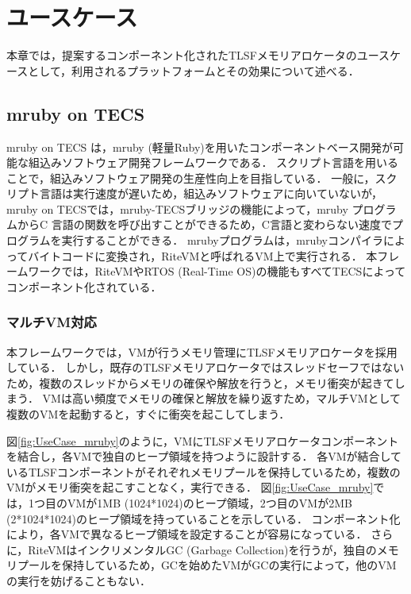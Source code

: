 \documentclass[submit,techrep]{ipsj_v2/UTF8/ipsj}
\begin{document}
\section{ユースケース}
\label{sec:UseCase}

本章では，提案するコンポーネント化されたTLSFメモリアロケータのユースケースとして，利用されるプラットフォームとその効果について述べる．

\subsection{mruby on TECS}
\label{sec:mrubyonTECS}

mruby on TECS は，mruby (軽量Ruby)\cite{par:mruby}\cite{url:mruby}を用いたコンポーネントベース開発が可能な組込みソフトウェア開発フレームワークである\cite{par:mrubyonTECS}．
スクリプト言語を用いることで，組込みソフトウェア開発の生産性向上を目指している．
一般に，スクリプト言語は実行速度が遅いため，組込みソフトウェアに向いていないが，mruby on TECSでは，mruby-TECSブリッジの機能によって，mruby プログラムからC 言語の関数を呼び出すことができるため，C言語と変わらない速度でプログラムを実行することができる．
mrubyプログラムは，mrubyコンパイラによってバイトコードに変換され，RiteVMと呼ばれるVM上で実行される．
本フレームワークでは，RiteVMやRTOS (Real-Time OS)の機能もすべてTECSによってコンポーネント化されている．


\subsubsection{マルチVM対応}

本フレームワークでは，VMが行うメモリ管理にTLSFメモリアロケータを採用している．
しかし，既存のTLSFメモリアロケータではスレッドセーフではないため，複数のスレッドからメモリの確保や解放を行うと，メモリ衝突が起きてしまう．
VMは高い頻度でメモリの確保と解放を繰り返すため，マルチVMとして複数のVMを起動すると，すぐに衝突を起こしてしまう．

図\ref{fig:UseCase_mruby}のように，VMにTLSFメモリアロケータコンポーネントを結合し，各VMで独自のヒープ領域を持つように設計する．
各VMが結合しているTLSFコンポーネントがそれぞれメモリプールを保持しているため，複数のVMがメモリ衝突を起こすことなく，実行できる．
図\ref{fig:UseCase_mruby}では，1つ目のVMが1MB (1024*1024)のヒープ領域，2つ目のVMが2MB (2*1024*1024)のヒープ領域を持っていることを示している．
コンポーネント化により，各VMで異なるヒープ領域を設定することが容易になっている．
さらに，RiteVMはインクリメンタルGC (Garbage Collection)を行うが，独自のメモリプールを保持しているため，GCを始めたVMがGCの実行によって，他のVMの実行を妨げることもない．
\end{document}
